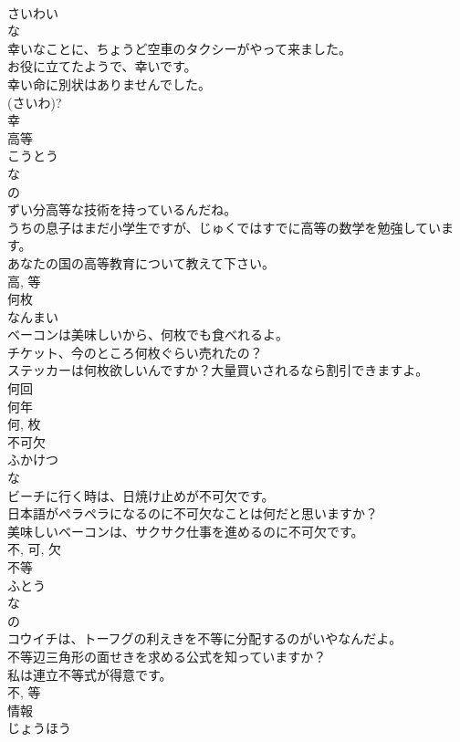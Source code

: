 \documentclass[8pt]{extreport}
\begin{document}
\begin{CJK}{UTF8}{min}
\\	さいわい	
\\	な 
\\	幸いなことに、ちょうど空車のタクシーがやって来ました。	
\\	お役に立てたようで、幸いです。	
\\	幸い命に別状はありませんでした。	
\\	(さいわ)?
\\	幸	
\\	高等	
\\	こうとう	
\\	な 
\\	の 
\\	ずい分高等な技術を持っているんだね。	
\\	うちの息子はまだ小学生ですが、じゅくではすでに高等の数学を勉強しています。	
\\	あなたの国の高等教育について教えて下さい。	
\\	高, 等	
\\	何枚	
\\	なんまい	
\\	ベーコンは美味しいから、何枚でも食べれるよ。	
\\	チケット、今のところ何枚ぐらい売れたの？	
\\	ステッカーは何枚欲しいんですか？大量買いされるなら割引できますよ。	
\\	何回 
\\	何年 
\\	何, 枚	
\\	不可欠	
\\	ふかけつ	
\\	な 
\\	ビーチに行く時は、日焼け止めが不可欠です。	
\\	日本語がペラペラになるのに不可欠なことは何だと思いますか？	
\\	美味しいベーコンは、サクサク仕事を進めるのに不可欠です。	
\\	不, 可, 欠	
\\	不等	
\\	ふとう	
\\	な 
\\	の 
\\	コウイチは、トーフグの利えきを不等に分配するのがいやなんだよ。	
\\	不等辺三角形の面せきを求める公式を知っていますか？	
\\	私は連立不等式が得意です。	
\\	不, 等	
\\	情報	
\\	じょうほう	

\end{CJK}
\end{document}

